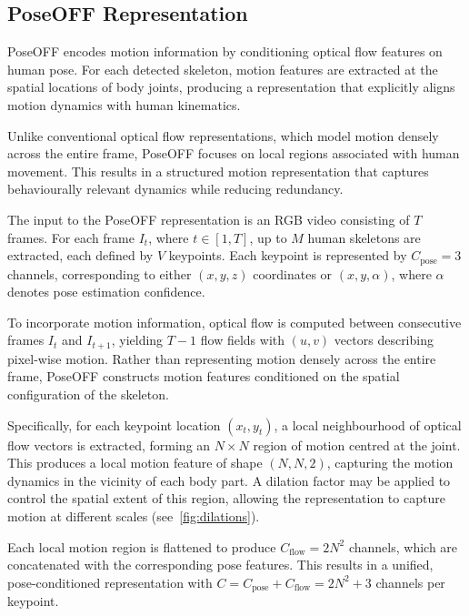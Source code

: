 \documentclass[letterpaper, 10 pt, conference]{ieeeconf}
\begin{document}
\subsection{PoseOFF Representation}
\label{subsec:PoseOFF}

PoseOFF encodes motion information by conditioning optical flow features on human pose. For each detected skeleton, motion features are extracted at the spatial locations of body joints, producing a representation that explicitly aligns motion dynamics with human kinematics.

Unlike conventional optical flow representations, which model motion densely across the entire frame, PoseOFF focuses on local regions associated with human movement. This results in a structured motion representation that captures behaviourally relevant dynamics while reducing redundancy.

The input to the PoseOFF representation is an RGB video consisting of $T$ frames. For each frame $I_t$, where $t \in [1, T]$, up to $M$ human skeletons are extracted, each defined by $V$ keypoints. Each keypoint is represented by $C_{\text{pose}} = 3$ channels, corresponding to either $(x,y,z)$ coordinates or $(x,y,\alpha)$, where $\alpha$ denotes pose estimation confidence.

To incorporate motion information, optical flow is computed between consecutive frames $I_t$ and $I_{t+1}$, yielding $T-1$ flow fields with $(u,v)$ vectors describing pixel-wise motion. Rather than representing motion densely across the entire frame, PoseOFF constructs motion features conditioned on the spatial configuration of the skeleton.

Specifically, for each keypoint location $(x_t, y_t)$, a local neighbourhood of optical flow vectors is extracted, forming an $N \times N$ region of motion centred at the joint. This produces a local motion feature of shape $(N, N, 2)$, capturing the motion dynamics in the vicinity of each body part. A dilation factor may be applied to control the spatial extent of this region, allowing the representation to capture motion at different scales (see~\autoref{fig:dilations}).

Each local motion region is flattened to produce $C_{\text{flow}} = 2N^2$ channels, which are concatenated with the corresponding pose features. This results in a unified, pose-conditioned representation with $C = C_{\text{pose}} + C_{\text{flow}} = 2N^2 + 3$ channels per keypoint.
\end{document}
